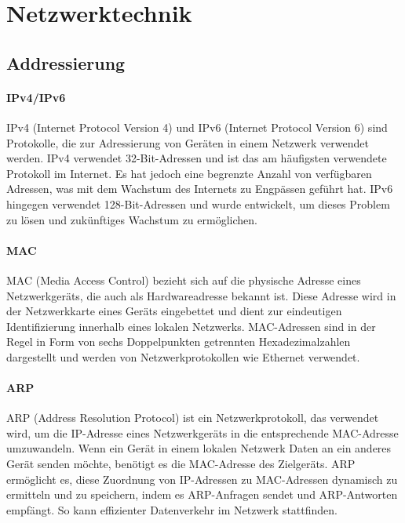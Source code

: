 \section{Netzwerktechnik}
\label{sec:Netzwerktechnik}

\subsection{Addressierung}

\paragraph{IPv4/IPv6}

IPv4 (Internet Protocol Version 4) und IPv6 (Internet Protocol Version 6) sind Protokolle, die zur Adressierung von Geräten in einem Netzwerk verwendet werden. IPv4 verwendet 32-Bit-Adressen und ist das am häufigsten verwendete Protokoll im Internet. Es hat jedoch eine begrenzte Anzahl von verfügbaren Adressen, was mit dem Wachstum des Internets zu Engpässen geführt hat. IPv6 hingegen verwendet 128-Bit-Adressen und wurde entwickelt, um dieses Problem zu lösen und zukünftiges Wachstum zu ermöglichen.

\paragraph{MAC}

MAC (Media Access Control) bezieht sich auf die physische Adresse eines Netzwerkgeräts, die auch als Hardwareadresse bekannt ist. Diese Adresse wird in der Netzwerkkarte eines Geräts eingebettet und dient zur eindeutigen Identifizierung innerhalb eines lokalen Netzwerks. MAC-Adressen sind in der Regel in Form von sechs Doppelpunkten getrennten Hexadezimalzahlen dargestellt und werden von Netzwerkprotokollen wie Ethernet verwendet.

\paragraph{ARP}

ARP (Address Resolution Protocol) ist ein Netzwerkprotokoll, das verwendet wird, um die IP-Adresse eines Netzwerkgeräts in die entsprechende MAC-Adresse umzuwandeln. Wenn ein Gerät in einem lokalen Netzwerk Daten an ein anderes Gerät senden möchte, benötigt es die MAC-Adresse des Zielgeräts. ARP ermöglicht es, diese Zuordnung von IP-Adressen zu MAC-Adressen dynamisch zu ermitteln und zu speichern, indem es ARP-Anfragen sendet und ARP-Antworten empfängt. So kann effizienter Datenverkehr im Netzwerk stattfinden.

